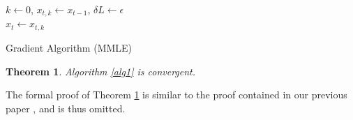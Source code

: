 \documentclass[journal]{IEEEtran}
\newtheorem{theorem}{Theorem}[section]
\newtheorem{alg}{Algorithm}[section]
\DeclareMathOperator*{\argmin}{arg\,min}
\begin{document}
%


{\tiny{
		\begin{algorithm}
			\DontPrintSemicolon
			$k \gets 0$, $x_{t,k} \gets x_{t-1}$, $\delta{L} \gets \epsilon$\\
\Return $\hat{x}_t \gets x_{t,k}$
			\caption{Gradient Algorithm (MMLE)}\label{alg1}
		\end{algorithm}
}}


\begin{theorem}
	Algorithm \ref{alg1} is convergent.
	\label{thm1}
\end{theorem}
The formal proof of Theorem \ref{thm1} is similar to the proof
contained in our previous paper \cite{park2014robust}, and is thus omitted.
%
\end{document}
